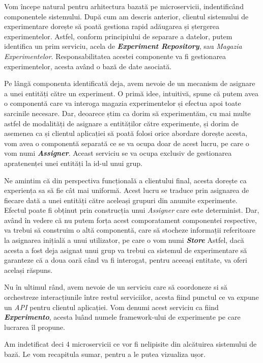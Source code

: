 Vom începe natural pentru arhitectura bazată pe microservicii, indentificând componentele sistemului. După cum am descris anterior, clientul sistemului de experimentare dorește să poată gestiona rapid adăugarea și ștergerea experimentelor. Astfel, conform principiului de separare a datelor, putem identifica un prim serviciu, acela de \textbf{\textit{Experiment Repository}}, sau \textit{Magazia Experimentelor}. Responsabilitatea acestei componente va fi gestionarea experimentelor, acesta având o bază de date asociată. 

Pe lângă componenta identificată deja, avem nevoie de un mecanism de asignare a unei entități către un experiment. O primă idee, intuitivă, spune că putem avea o componentă care va interoga magazia experimentelor și efectua apoi toate sarcinile necesare. Dar, deoarece știm ca dorim să experimentăm, cu mai multe astfel de modalități de asignare a entităților către experimente, și dorim de asemenea ca și clientul aplicației să poată folosi orice abordare dorește acesta, vom avea o componentă separată ce se va ocupa doar de acest lucru, pe care o vom numi \textit{\textbf{Assigner}}. Aceast serviciu se va ocupa exclusiv de gestionarea apratenenței unei entități la id-ul unui grup.

Ne amintim că din perspectiva funcțională a clientului final, acesta dorește ca experiența sa să fie cât mai uniformă. Acest lucru se traduce prin asignarea de fiecare dată a unei entități către aceleași grupuri din anumite experimente. Efectul poate fi obținut prin construcția unui \textit{Assigner} care este determinist. Dar, având în vedere că nu putem forța acest comporatament componentei respective, va trebui să construim o altă componentă, care să stocheze informații referitoare la asignarea inițială a unui utilizator, pe care o vom numi \textit{\textbf{Store}} Astfel, dacă acesta a fost deja asignat unui grup va trebui ca sistemul de experimentare să garanteze că a doua oară când va fi interogat, pentru aceeași entitate, va oferi același răspuns.

Nu în ultimul rând, avem nevoie de un serviciu care să coordoneze si să orchestreze interacțiunile între restul serviciilor, acesta fiind punctul ce va expune un \textit{API} pentru clientul aplicației. Vom denumi acest serviciu ca fiind \textit{\textbf{Experimento}}, acesta luând numele framework-ului de experimente pe care lucrarea îl propune. 

Am indetificat deci 4 microservicii ce vor fi nelipisite din alcătuirea sistemului de bază. Le vom recapitula sumar, pentru a le putea vizualiza ușor.

